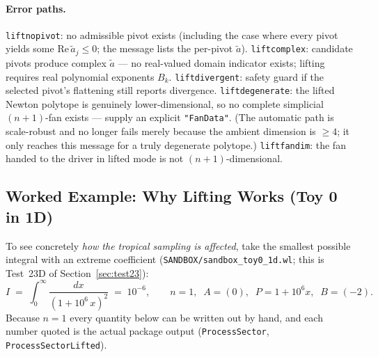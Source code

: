 \documentclass[11pt,a4paper]{article}
\begin{document}
\paragraph{Error paths.} \texttt{liftnopivot}: no admissible pivot exists
(including the case where every pivot yields some
$\mathrm{Re}\,\tilde{a}_j \leq 0$; the message lists the per-pivot
$\tilde{a}$). \texttt{liftcomplex}: candidate pivots produce complex
$\tilde{a}$ --- no real-valued domain indicator exists; lifting requires real
polynomial exponents $B_k$. \texttt{liftdivergent}: safety guard if the
selected pivot's flattening still reports divergence.
\texttt{liftdegenerate}: the lifted Newton polytope is genuinely
lower-dimensional, so no complete simplicial $(n{+}1)$-fan exists --- supply an
explicit \texttt{"FanData"}. (The automatic path is scale-robust and no longer
fails merely because the ambient dimension is $\ge4$; it only reaches this
message for a truly degenerate polytope.) \texttt{liftfandim}: the fan handed to the driver in
lifted mode is not $(n{+}1)$-dimensional.

\subsection{Worked Example: Why Lifting Works (Toy 0 in 1D)}\label{sec:lift-example}

To see concretely \emph{how the tropical sampling is affected}, take the
smallest possible integral with an extreme coefficient
(\texttt{SANDBOX/sandbox\_toy0\_1d.wl}; this is Test~23D of
Section~\ref{sec:test23}):
\begin{equation}\label{eq:toy0}
I \;=\; \int_0^\infty \frac{dx}{(1 + 10^6\,x)^2} \;=\; 10^{-6},
\qquad n=1,\;\; A=(0),\;\; P = 1 + 10^6 x,\;\; B=(-2).
\end{equation}
Because $n=1$ every quantity below can be written out by hand, and each number
quoted is the actual package output (\texttt{ProcessSector},
\texttt{ProcessSectorLifted}).
\end{document}
